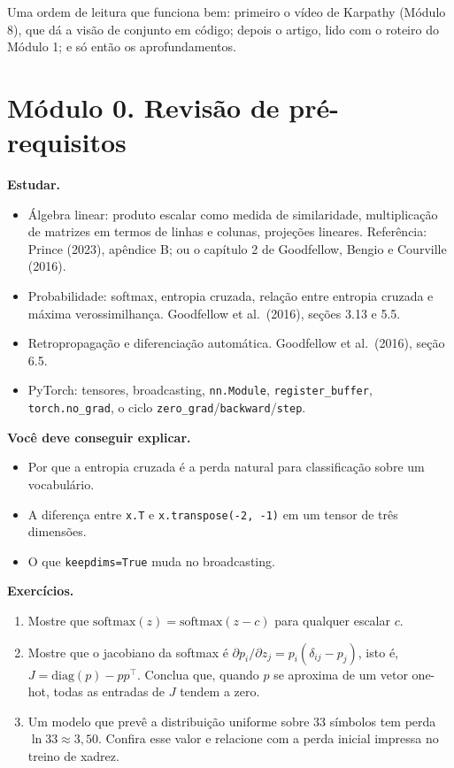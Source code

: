 \documentclass[
  11pt,
]{article}
\providecommand{\tightlist}{%
  \setlength{\itemsep}{0pt}\setlength{\parskip}{0pt}}
\begin{document}
Uma ordem de leitura que funciona bem: primeiro o vídeo de Karpathy
(Módulo 8), que dá a visão de conjunto em código; depois o artigo, lido
com o roteiro do Módulo 1; e só então os aprofundamentos.

\section{Módulo 0. Revisão de
pré-requisitos}\label{muxf3dulo-0.-revisuxe3o-de-pruxe9-requisitos}

\textbf{Estudar.}

\begin{itemize}
\tightlist
\item
  Álgebra linear: produto escalar como medida de similaridade,
  multiplicação de matrizes em termos de linhas e colunas, projeções
  lineares. Referência: Prince (2023), apêndice B; ou o capítulo 2 de
  Goodfellow, Bengio e Courville (2016).
\item
  Probabilidade: softmax, entropia cruzada, relação entre entropia
  cruzada e máxima verossimilhança. Goodfellow et al.~(2016), seções
  3.13 e 5.5.
\item
  Retropropagação e diferenciação automática. Goodfellow et al.~(2016),
  seção 6.5.
\item
  PyTorch: tensores, broadcasting, \texttt{nn.Module},
  \texttt{register\_buffer}, \texttt{torch.no\_grad}, o ciclo
  \texttt{zero\_grad}/\texttt{backward}/\texttt{step}.
\end{itemize}

\textbf{Você deve conseguir explicar.}

\begin{itemize}
\tightlist
\item
  Por que a entropia cruzada é a perda natural para classificação sobre
  um vocabulário.
\item
  A diferença entre \texttt{x.T} e \texttt{x.transpose(-2,\ -1)} em um
  tensor de três dimensões.
\item
  O que \texttt{keepdims=True} muda no broadcasting.
\end{itemize}

\textbf{Exercícios.}

\begin{enumerate}
\def\labelenumi{\arabic{enumi}.}
\tightlist
\item
  Mostre que \(\text{softmax}(z) = \text{softmax}(z - c)\) para qualquer
  escalar \(c\).
\item
  Mostre que o jacobiano da softmax é
  \(\partial p_i / \partial z_j = p_i(\delta_{ij} - p_j)\), isto é,
  \(J = \text{diag}(p) - pp^\top\). Conclua que, quando \(p\) se
  aproxima de um vetor one-hot, todas as entradas de \(J\) tendem a
  zero.
\item
  Um modelo que prevê a distribuição uniforme sobre 33 símbolos tem
  perda \(\ln 33 \approx 3{,}50\). Confira esse valor e relacione com a
  perda inicial impressa no treino de xadrez.
\end{enumerate}
\end{document}
